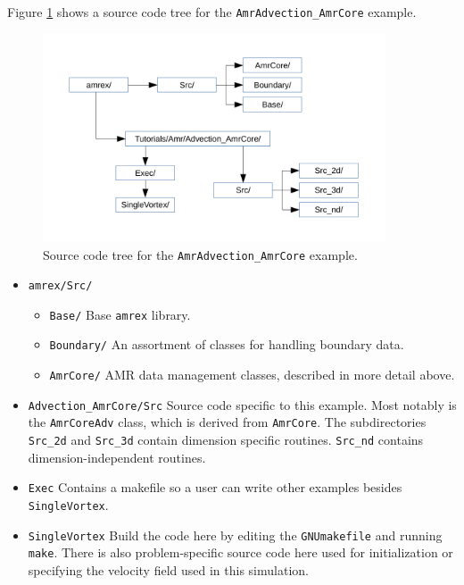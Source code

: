 Figure \ref{fig:AmrAdvection_AmrCore_flowchart} shows a source
code tree for the {\tt AmrAdvection\_AmrCore} example.
\begin{figure}[htb]
\begin{center}
\includegraphics[width=4in]{./AmrCore/figs/flowchart.pdf}
\caption{\label{fig:AmrAdvection_AmrCore_flowchart} Source code tree for the 
         {\tt AmrAdvection\_AmrCore} example.}
\end{center}
\end{figure}
\begin{itemize}
\item {\tt amrex/Src/}
\begin{itemize}
\item {\tt Base/} Base {\tt amrex} library.
\item {\tt Boundary/} An assortment of classes for handling boundary data.
\item {\tt AmrCore/} AMR data management classes, described in more detail above.
\end{itemize}
\item {\tt Advection\_AmrCore/Src} Source code specific to this example.  Most notably
is the {\tt AmrCoreAdv} class, which is derived from {\tt AmrCore}.  The subdirectories {\tt Src\_2d}
and {\tt Src\_3d} contain dimension specific routines.  {\tt Src\_nd} contains dimension-independent routines.
\item {\tt Exec} Contains a makefile so a user can write other examples besides {\tt SingleVortex}.
\item {\tt SingleVortex} Build the code here by editing the {\tt GNUmakefile} and running {\tt make}.  There
is also problem-specific source code here used for initialization or specifying the velocity field used in this
simulation.
\end{itemize}

